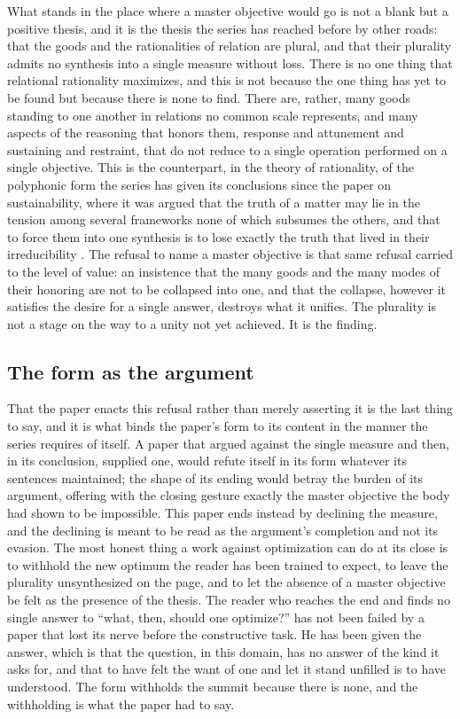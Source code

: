 What stands in the place where a master objective would go is not a blank but a positive thesis, and it is the thesis the series has reached before by other roads: that the goods and the rationalities of relation are plural, and that their plurality admits no synthesis into a single measure without loss. There is no one thing that relational rationality maximizes, and this is not because the one thing has yet to be found but because there is none to find. There are, rather, many goods standing to one another in relations no common scale represents, and many aspects of the reasoning that honors them, response and attunement and sustaining and restraint, that do not reduce to a single operation performed on a single objective. This is the counterpart, in the theory of rationality, of the polyphonic form the series has given its conclusions since the paper on sustainability, where it was argued that the truth of a matter may lie in the tension among several frameworks none of which subsumes the others, and that to force them into one synthesis is to lose exactly the truth that lived in their irreducibility \parencite{paperix}. The refusal to name a master objective is that same refusal carried to the level of value: an insistence that the many goods and the many modes of their honoring are not to be collapsed into one, and that the collapse, however it satisfies the desire for a single answer, destroys what it unifies. The plurality is not a stage on the way to a unity not yet achieved. It is the finding.

\subsection*{The form as the argument}

That the paper enacts this refusal rather than merely asserting it is the last thing to say, and it is what binds the paper's form to its content in the manner the series requires of itself. A paper that argued against the single measure and then, in its conclusion, supplied one, would refute itself in its form whatever its sentences maintained; the shape of its ending would betray the burden of its argument, offering with the closing gesture exactly the master objective the body had shown to be impossible. This paper ends instead by declining the measure, and the declining is meant to be read as the argument's completion and not its evasion. The most honest thing a work against optimization can do at its close is to withhold the new optimum the reader has been trained to expect, to leave the plurality unsynthesized on the page, and to let the absence of a master objective be felt as the presence of the thesis. The reader who reaches the end and finds no single answer to ``what, then, should one optimize?'' has not been failed by a paper that lost its nerve before the constructive task. He has been given the answer, which is that the question, in this domain, has no answer of the kind it asks for, and that to have felt the want of one and let it stand unfilled is to have understood. The form withholds the summit because there is none, and the withholding is what the paper had to say.
